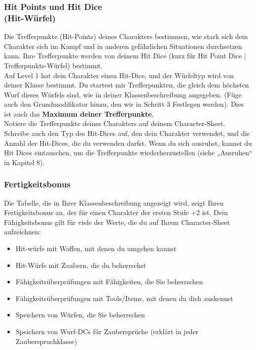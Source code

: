\subsubsection{Hit Points und Hit Dice \\(Hit-Würfel)}
Die Trefferpunkte (Hit-Points) deines Charakters bestimmen, wie stark sich dein Charakter sich im Kampf und in anderen gefährlichen Situationen durchsetzen kann. Ihre Trefferpunkte werden von deinem Hit Dice (kurz für Hit Point Dice | Trefferpunkts-Würfel) bestimmt.\\
Auf Level 1 hat dein Charakter einen Hit-Dice, und der Würfeltyp wird von deiner Klasse bestimmt.
Du startest mir Trefferpunkten, die gleich dem höchsten Wurf dieses Würfels sind, wie in deiner Klassenbeschreibung angegeben. (Füge auch den Grundmodifikator hinzu, den wir in Schritt 3 Festlegen werden). Dies ist auch das \textbf{Maximum deiner Trefferpunkte}.\\
Notiere die Trefferpunkte deines Charakters auf deinem Character-Sheet. Schreibe auch den Typ des Hit-Dices auf, den dein Charakter verwendet, und die Anzahl der Hit-Dices, die du verwenden darfst. Wenn du sich ausruhst, kannst du Hit Dices eintauschen, um die Trefferpunkte wiederherzustellen (siehe „Ausruhen“ in Kapitel 8).

\subsubsection{Fertigkeitsbonus}
Die Tabelle, die in Ihrer Klassenbeschreibung angezeigt wird, zeigt Ihren Fertigkeitsbonus an, der für einen Charakter der ersten Stufe +2 ist. Dein Fähigkeitsbonus gilt für viele der Werte, die du auf Ihrem Character-Sheet aufzeichnen:
\begin{itemize}
	\item Hit-würfe mit Waffen, mit denen du umgehen kannst
	\item Hit-Würfe mit Zaubern, die du beherrschst
	\item Fähigkeitsüberprüfungen mit Fähigkeiten, die Sie beherrschen
	\item Fähigkeitsüberprüfungen mit Tools/Items, mit denen du dich auskennst
	\item Speichern von Würfen, die Sie beherrschen
	\item Speichern von Wurf-DCs für Zaubersprüche (erklärt in jeder Zauberspruchklasse)
\end{itemize}

